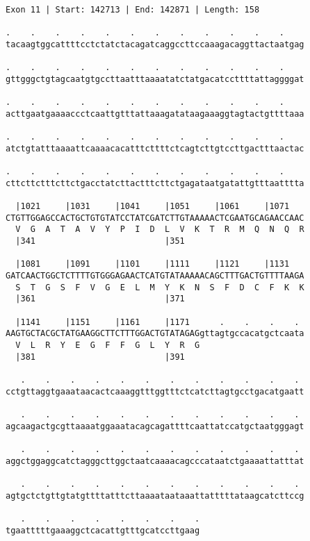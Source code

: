 \documentclass{article}
\begin{document}
\begin{Verbatim}[fontfamily=courier]
Exon 11 | Start: 142713 | End: 142871 | Length: 158

.    .    .    .    .    .    .    .    .    .    .    .    
tacaagtggcattttcctctatctacagatcaggccttccaaagacaggttactaatgag

.    .    .    .    .    .    .    .    .    .    .    .    
gttgggctgtagcaatgtgccttaatttaaaatatctatgacatccttttattaggggat

.    .    .    .    .    .    .    .    .    .    .    .    
acttgaatgaaaaccctcaattgtttattaaagatataagaaaggtagtactgttttaaa

.    .    .    .    .    .    .    .    .    .    .    .    
atctgtatttaaaattcaaaacacatttcttttctcagtcttgtccttgactttaactac

.    .    .    .    .    .    .    .    .    .    .    .    
cttcttctttcttctgacctatcttactttcttctgagataatgatattgtttaatttta

  |1021     |1031     |1041     |1051     |1061     |1071   
CTGTTGGAGCCACTGCTGTGTATCCTATCGATCTTGTAAAAACTCGAATGCAGAACCAAC
  V  G  A  T  A  V  Y  P  I  D  L  V  K  T  R  M  Q  N  Q  R
  |341                          |351                        

  |1081     |1091     |1101     |1111     |1121     |1131   
GATCAACTGGCTCTTTTGTGGGAGAACTCATGTATAAAAACAGCTTTGACTGTTTTAAGA
  S  T  G  S  F  V  G  E  L  M  Y  K  N  S  F  D  C  F  K  K
  |361                          |371                        

  |1141     |1151     |1161     |1171      .    .    .    . 
AAGTGCTACGCTATGAAGGCTTCTTTGGACTGTATAGAGgttagtgccacatgctcaata
  V  L  R  Y  E  G  F  F  G  L  Y  R  G                     
  |381                          |391                        

   .    .    .    .    .    .    .    .    .    .    .    . 
cctgttaggtgaaataacactcaaaggtttggtttctcatcttagtgcctgacatgaatt

   .    .    .    .    .    .    .    .    .    .    .    . 
agcaagactgcgttaaaatggaaatacagcagattttcaattatccatgctaatgggagt

   .    .    .    .    .    .    .    .    .    .    .    . 
aggctggaggcatctagggcttggctaatcaaaacagcccataatctgaaaattatttat

   .    .    .    .    .    .    .    .    .    .    .    . 
agtgctctgttgtatgttttatttcttaaaataataaattatttttataagcatcttccg

   .    .    .    .    .    .    .    .
tgaatttttgaaaggctcacattgtttgcatccttgaag
\end{Verbatim}
\end{document}
